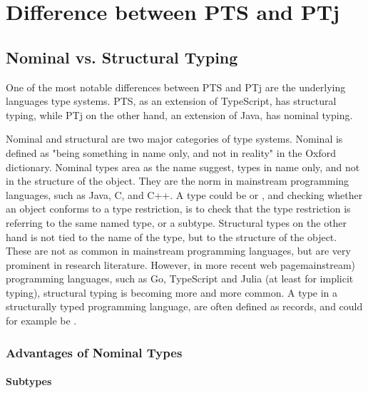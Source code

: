 
\chapter{Difference between PTS and PTj}\label{ch:difference-between-pts-and-ptj}


\section{Nominal vs. Structural Typing}\label{sec:nominal-vs-structural-typing}


One of the most notable differences between PTS and PTj are the underlying languages type systems.
PTS, as an extension of TypeScript, has structural typing, while PTj on the other hand, an extension of Java, has nominal typing.

Nominal and structural are two major categories of type systems.
Nominal is defined as "being something in name only, and not in reality" in the Oxford dictionary.
Nominal types area as the name suggest, types in name only, and not in the structure of the object.
They are the norm in mainstream programming languages, such as Java, C, and C++.
A type could be  or , and checking whether an object conforms to a type restriction, is to check that the type restriction is referring to the same named type, or a subtype.
Structural types on the other hand is not tied to the name of the type, but to the structure of the object.
These are not as common in mainstream programming languages, but are very prominent in research literature.
However, in more recent web pagemainstream) programming languages, such as Go, TypeScript and Julia (at least for implicit typing), structural typing is becoming more and more common.
A type in a structurally typed programming language, are often defined as records, and could for example be .

\subsection{Advantages of Nominal Types}\label{subsec:advantages-of-nominal-types}

\subsubsection{Subtypes}\label{subsubsec:subtypes}

